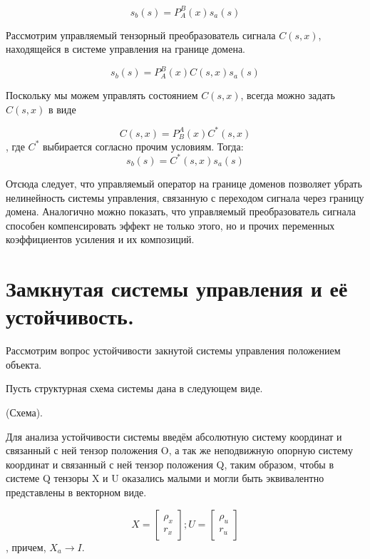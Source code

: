 \documentclass[a4paper]{article}
\begin{document}
\begin{equation} s_b(s) = P_A^B(x) s_a(s) \end{equation}

Рассмотрим управляемый тензорный преобразователь сигнала $C(s,x)$, находящейся в системе управления на границе домена.

\begin{equation} s_b(s) = P_A^B(x) C(s,x) s_a(s) \end{equation}

Поскольку мы можем управлять состоянием $C(s,x)$, всегда можно задать $C(s,x)$ в виде

\begin{equation} C(s,x) = P_B^A(x) C^*(s,x) \end{equation}
, где $C^*$ выбирается согласно прочим условиям. Тогда:
\begin{equation} s_b(s) = C^*(s,x) s_a(s) \end{equation}

Отсюда следует, что управляемый оператор на границе доменов позволяет убрать нелинейность системы управления, связанную с переходом сигнала через границу домена. Аналогично можно показать, что управляемый преобразователь сигнала способен компенсировать эффект не только этого, но и прочих переменных коэффициентов усиления и их композиций.

\section{Замкнутая системы управления и её устойчивость.}
Рассмотрим вопрос устойчивости закнутой системы управления положением объекта.

Пусть структурная схема системы дана в следующем виде.

(Схема).

Для анализа устойчивости системы введём абсолютную систему координат и связанный с ней тензор положения O, а так же неподвижную опорную систему координат и связанный с ней тензор положения Q, таким образом, чтобы в системе Q тензоры X и U оказались малыми и могли быть эквивалентно представлены в векторном виде.

\begin{equation}
X = \begin{bmatrix}\rho_x\\r_x\end{bmatrix};  
U = \begin{bmatrix}\rho_u\\r_u\end{bmatrix}
\end{equation},
причем, $X_a \rightarrow I$.
\end{document}
